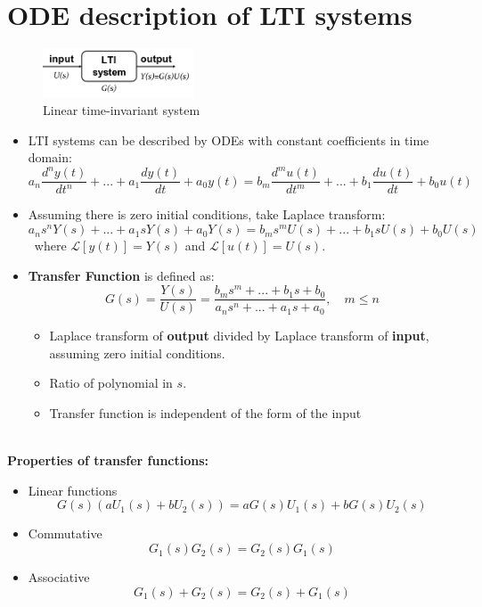 \documentclass[12pt,a4paper]{article}
\begin{document}
\section{ODE description of LTI systems}

\begin{figure}[H] \centering
\includegraphics[width=0.4\textwidth]{images/LTI_independent.pdf}
\caption{Linear time-invariant system}
\end{figure}
\begin{itemize}
\item LTI systems can be described by ODEs with constant coefficients in time domain:
\[ a_{n} \frac{d^{n}y(t)}{dt^{n}}+...+a_{1} \frac{dy(t)}{dt}+a_{0} y(t) = b_{m} \frac{d^{m}u(t)}{dt^{m}}+...+b_{1} \frac{du(t)}{dt}+b_{0} u(t) \]

\item Assuming there is zero initial conditions, take Laplace transform:
\[ a_{n} s^{n} Y(s)+...+ a_{1} s Y(s) + a_{0} Y(s) = b_{m} s^{m} U(s)+...+b_{1} s U(s) + b_{0} U(s)\]
 \ where $\mathcal{L}[y(t)] = Y(s)$ and $\mathcal{L}[u(t)] = U(s)$. 

\item \textbf{Transfer Function} is defined as:
\[ \boxed{G(s)=\frac{Y(s)}{U(s)}=\frac{b_{m} s^{m}+...+b_{1} s +b_{0}}{a_{n} s^{n}+...+a_{1} s+a_{0}},\quad m \leq n }\] 
\begin{itemize}
 \item Laplace transform of \textbf{output} divided by Laplace transform of \textbf{input}, assuming zero initial conditions.
 \item Ratio of polynomial in $s$.
 \item Transfer function is independent of the form of the input
\end{itemize}
\end{itemize}
\ \\
\textbf{Properties of transfer functions:}
\begin{itemize}
\item Linear functions
\[ G(s) (aU_{1}(s)+bU_{2}(s)) = aG(s)U_{1}(s)+b G(s) U_{2}(s)\]
\item Commutative
\[G_{1}(s) G_{2}(s) = G_{2}(s)G_{1}(s)\]
\item Associative
\[ G_{1}(s) +G_{2}(s) = G_{2}(s) +G_{1}(s) \]
\end{itemize}
\end{document}
